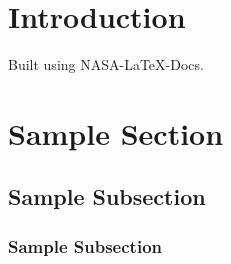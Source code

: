 \documentclass[template=aiaa-journal]{nasa-latex-docs}
\begin{document}
\section{Introduction}

Built using NASA-LaTeX-Docs.\cite{nasa-latex-docs}

\section{Sample Section}

\lipsum[1]

\subsection{Sample Subsection}

\lipsum[2]

\subsubsection{Sample Subsection}

\lipsum[2]

\printbibliography
\end{document}
